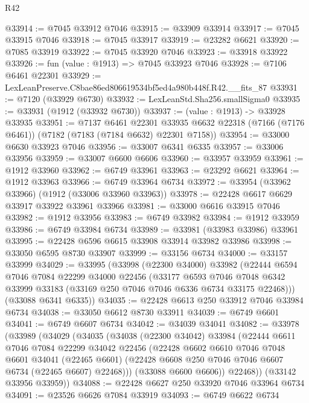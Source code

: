 \begin{lexlean}{R42}
\begin{coremodule}
{@33914 := @7045 @33912 @7046
@33915 := @33909 @33914
@33917 := @7045 @33915 @7046
@33918 := @7045 @33917
@33919 := @23282 @6621
@33920 := @7085 @33919
@33922 := @7045 @33920 @7046
@33923 := @33918 @33922
@33926 := fun (value : @1913) => @7045 @33923 @7046
@33928 := @7106 @6461 @22301
@33929 := LexLeanPreserve.C8bae86ed806619534bf5ed4a980b448f.R42.__fits_87
@33931 := @7120 (@33929 @6730)
@33932 := LexLeanStd.Sha256.smallSigma0
@33935 := @33931 (@1912 (@33932 @6730))
@33937 := (value : @1913) -> @33928 @33935
@33951 := @7137
    @6461
    @22301
    @33935
    @6632
    @22318
    (@7166 (@7176 @6461))
    (@7182 (@7183 (@7184 @6632) @22301 @7158))
@33954 := @33000 @6630 @33923 @7046
@33956 := @33007 @6341 @6335
@33957 := @33006 @33956
@33959 := @33007 @6600 @6606
@33960 := @33957 @33959
@33961 := @1912 @33960
@33962 := @6749 @33961
@33963 := @23292 @6621
@33964 := @1912 @33963
@33966 := @6749 @33964 @6734
@33972 := @33954 (@33962 @33966) (@1912 (@33006 @33960 @33963))
@33978 := @22428 @6617 @6629 @33917 @33922 @33961 @33966
@33981 := @33000 @6616 @33915 @7046
@33982 := @1912 @33956
@33983 := @6749 @33982
@33984 := @1912 @33959
@33986 := @6749 @33984 @6734
@33989 := @33981 (@33983 @33986) @33961
@33995 := @22428 @6596 @6615 @33908 @33914 @33982 @33986
@33998 := @33050 @6595 @8730 @33907
@33999 := @33156 @6734
@34000 := @33157 @33999
@34029 := @33995
    (@33998
      (@22300 @34000)
      @33982
      (@22444
        @6594
        @7046
        @7084
        @22299
        @34000
        @22456
        (@33177
          @6593
          @7046
          @7048
          @6342
          @33999
          @33183
          (@33169 @250 @7046 @7046 @6336 @6734 @33175 @22468)))
      (@33088 @6341 @6335))
@34035 := @22428 @6613 @250 @33912 @7046 @33984 @6734
@34038 := @33050 @6612 @8730 @33911
@34039 := @6749 @6601
@34041 := @6749 @6607 @6734
@34042 := @34039 @34041
@34082 := @33978
    (@33989
      (@34029
        (@34035
          (@34038
            (@22300 @34042)
            @33984
            (@22444
              @6611
              @7046
              @7084
              @22299
              @34042
              @22456
              (@22428
                @6602
                @6610
                @7046
                @7048
                @6601
                @34041
                (@22465 @6601)
                (@22428 @6608 @250 @7046 @7046 @6607 @6734 (@22465 @6607) @22468)))
            (@33088 @6600 @6606))
          @22468))
      (@33142 @33956 @33959))
@34088 := @22428 @6627 @250 @33920 @7046 @33964 @6734
@34091 := @23526 @6626 @7084 @33919
@34093 := @6749 @6622 @6734
}
\end{coremodule}
\end{lexlean}
